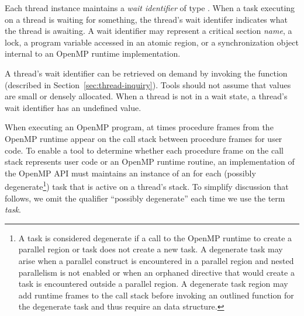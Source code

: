 Each thread instance maintains a {\em wait identifier} of type .
When a task executing on a thread is waiting for something, the thread's wait identifer indicates what the thread is awaiting.
A wait identifier may represent a critical section {\em name}, a lock,  a program variable accessed in an atomic region, or a synchronization object internal to an OpenMP runtime implementation.
\begin{comment}
\begin{boxedcode}
typedef uint64\_t ompt\_wait\_id\_t;
\end{boxedcode}
\end{comment}
A thread's wait identifier can be retrieved on demand by invoking the  function (described in Section~\ref{sec:thread-inquiry}).
Tools should not assume that  values are small or densely allocated.
When a thread is not in a wait state, a thread's wait identifier has an undefined value.


When executing an OpenMP program, at times procedure frames from the OpenMP runtime appear on the call stack between procedure frames for user code.
To enable a tool to determine whether each procedure frame on the call stack represents
user code or an OpenMP runtime routine,
an implementation of the OpenMP API must maintains an instance of an 
for each (possibly degenerate\footnote{
A task is considered degenerate if a call to the OpenMP runtime to create a parallel
region or task does not create a new task.
A degenerate task may arise when a parallel construct is encountered
in a parallel region and nested parallelism is not enabled or when an orphaned directive that would create a task is encountered outside a parallel region.
A degenerate task region may add runtime frames to the call stack before
invoking an outlined function for the degenerate task and thus require an 
data structure.}) task that is active on a thread's stack.
To simplify discussion that follows,
we omit the qualifier ``possibly degenerate'' each time we use the term {\em task}.

